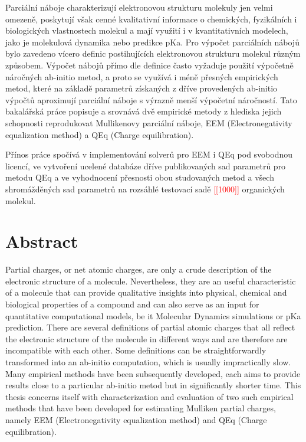 \documentclass[10pt,draft,oneside]{fithesis2}
\newcommand\fixme[1]{\textcolor{red}{[[#1]]}}
\begin{document}
\begin{ThesisAbstract}
Parciální náboje charakterizují elektronovou strukturu molekuly jen velmi omezeně, poskytují však cenné kvalitativní informace o chemických, fyzikálních i biologických vlastnostech molekul a mají využití i v kvantitativních modelech, jako je molekulová dynamika nebo predikce pKa. Pro výpočet parciálních nábojů bylo zavedeno vícero definic postihujících elektronovou strukturu molekul různým způsobem. Výpočet nábojů přímo dle definice často vyžaduje použití výpočetně náročných ab-initio metod, a proto se využívá i méně přesných empirických metod, které na základě parametrů získaných z dříve provedených ab-initio výpočtů aproximují parciální náboje s výrazně menší výpočetní náročností. Tato bakalářská práce popisuje a srovnává dvě empirické metody z hlediska jejich schopnosti reprodukovat Mullikenovy parciální náboje, EEM (Electronegativity equalization method) a QEq (Charge equilibration).

Přínos práce spočívá v implementování solverů pro EEM i QEq pod svobodnou licencí, ve vytvoření ucelené databáze dříve publikovaných sad parametrů pro metodu QEq a ve vyhodnocení přesnosti obou studovaných metod a všech shromážděných sad parametrů na rozsáhlé testovací sadě \fixme{1000} organických molekul.

\begingroup
\let\clearpage\relax
{}
\chapter*{Abstract}
\endgroup

Partial charges, or net atomic charges, are only a crude description of the electronic structure of a molecule. Nevertheless, they are an useful characteristic of a molecule that can provide qualitative insights into physical, chemical and biological properties of a compound and can also serve as an input for quantitative computational models, be it Molecular Dynamics simulations or pKa prediction. There are several definitions of partial atomic charges that all reflect the electronic structure of the molecule in different ways and are therefore are incompatible with each other. Some definitions can be straightforwardly transformed into an ab-initio computation, which is usually impractically slow. Many empirical methods have been subsequently developed, each aims to provide results close to a particular ab-initio metod but in significantly shorter time. This thesis concerns itself with characterization and evaluation of two such empirical methods that have been developed for estimating Mulliken partial charges, namely EEM (Electronegativity equalization method) and QEq (Charge equilibration).


\end{ThesisAbstract}
\end{document}
